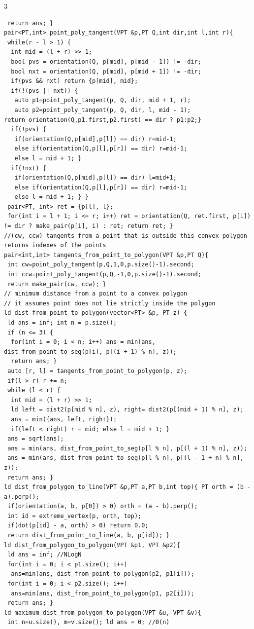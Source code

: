 \documentclass[8pt,a4paper,onesided]{article}
\begin{document}
\begin{multicols}{3}
\begin{verbatim}
 return ans; }
pair<PT,int> point_poly_tangent(VPT &p,PT Q,int dir,int l,int r){
 while(r - l > 1) {
  int mid = (l + r) >> 1;
  bool pvs = orientation(Q, p[mid], p[mid - 1]) != -dir;
  bool nxt = orientation(Q, p[mid], p[mid + 1]) != -dir;
  if(pvs && nxt) return {p[mid], mid};
  if(!(pvs || nxt)) {
   auto p1=point_poly_tangent(p, Q, dir, mid + 1, r);
   auto p2=point_poly_tangent(p, Q, dir, l, mid - 1);
return orientation(Q,p1.first,p2.first) == dir ? p1:p2;}
  if(!pvs) {
   if(orientation(Q,p[mid],p[l]) == dir) r=mid-1;
   else if(orientation(Q,p[l],p[r]) == dir) r=mid-1;
   else l = mid + 1; }
  if(!nxt) {
   if(orientation(Q,p[mid],p[l]) == dir) l=mid+1;
   else if(orientation(Q,p[l],p[r]) == dir) r=mid-1;
   else l = mid + 1; } }
 pair<PT, int> ret = {p[l], l};
 for(int i = l + 1; i <= r; i++) ret = orientation(Q, ret.first, p[i]) != dir ? make_pair(p[i], i) : ret; return ret; }
//(cw, ccw) tangents from a point that is outside this convex polygon returns indexes of the points
pair<int,int> tangents_from_point_to_polygon(VPT &p,PT Q){
 int cw=point_poly_tangent(p,Q,1,0,p.size()-1).second;
 int ccw=point_poly_tangent(p,Q,-1,0,p.size()-1).second;
 return make_pair(cw, ccw); }
// minimum distance from a point to a convex polygon
// it assumes point does not lie strictly inside the polygon
ld dist_from_point_to_polygon(vector<PT> &p, PT z) {
 ld ans = inf; int n = p.size();
 if (n <= 3) {
  for(int i = 0; i < n; i++) ans = min(ans, dist_from_point_to_seg(p[i], p[(i + 1) % n], z));
  return ans; }
 auto [r, l] = tangents_from_point_to_polygon(p, z);
 if(l > r) r += n;
 while (l < r) {
  int mid = (l + r) >> 1;
  ld left = dist2(p[mid % n], z), right= dist2(p[(mid + 1) % n], z);
  ans = min({ans, left, right});
  if(left < right) r = mid; else l = mid + 1; }
 ans = sqrt(ans);
 ans = min(ans, dist_from_point_to_seg(p[l % n], p[(l + 1) % n], z));
 ans = min(ans, dist_from_point_to_seg(p[l % n], p[(l - 1 + n) % n], z));
 return ans; }
ld dist_from_polygon_to_line(VPT &p,PT a,PT b,int top){ PT orth = (b - a).perp();
 if(orientation(a, b, p[0]) > 0) orth = (a - b).perp();
 int id = extreme_vertex(p, orth, top);
 if(dot(p[id] - a, orth) > 0) return 0.0;
 return dist_from_point_to_line(a, b, p[id]); }
ld dist_from_polygon_to_polygon(VPT &p1, VPT &p2){
 ld ans = inf; //NLogN
 for(int i = 0; i < p1.size(); i++)
  ans=min(ans, dist_from_point_to_polygon(p2, p1[i]));
 for(int i = 0; i < p2.size(); i++)
  ans=min(ans, dist_from_point_to_polygon(p1, p2[i]));
 return ans; }
ld maximum_dist_from_polygon_to_polygon(VPT &u, VPT &v){
 int n=u.size(), m=v.size(); ld ans = 0; //0(n)

\end{verbatim}
\end{multicols}
\end{document}
